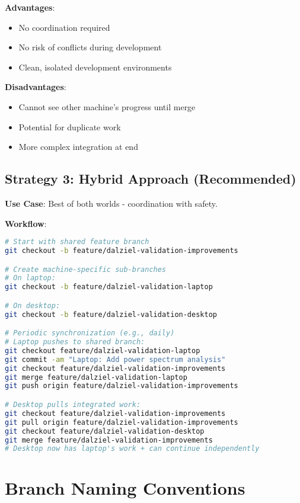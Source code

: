 \documentclass[11pt,letterpaper]{article}
\begin{document}
\textbf{Advantages}:
\begin{itemize}[label=\checkmark]
    \item No coordination required
    \item No risk of conflicts during development
    \item Clean, isolated development environments
\end{itemize}

\textbf{Disadvantages}:
\begin{itemize}[label=\textbullet]
    \item Cannot see other machine's progress until merge
    \item Potential for duplicate work
    \item More complex integration at end
\end{itemize}

\subsection{Strategy 3: Hybrid Approach (Recommended)}

\textbf{Use Case}: Best of both worlds - coordination with safety.

\textbf{Workflow}:
\begin{lstlisting}[language=bash]
# Start with shared feature branch
git checkout -b feature/dalziel-validation-improvements

# Create machine-specific sub-branches
# On laptop:
git checkout -b feature/dalziel-validation-laptop

# On desktop:
git checkout -b feature/dalziel-validation-desktop

# Periodic synchronization (e.g., daily)
# Laptop pushes to shared branch:
git checkout feature/dalziel-validation-laptop
git commit -am "Laptop: Add power spectrum analysis"
git checkout feature/dalziel-validation-improvements
git merge feature/dalziel-validation-laptop
git push origin feature/dalziel-validation-improvements

# Desktop pulls integrated work:
git checkout feature/dalziel-validation-improvements
git pull origin feature/dalziel-validation-improvements
git checkout feature/dalziel-validation-desktop
git merge feature/dalziel-validation-improvements
# Desktop now has laptop's work + can continue independently
\end{lstlisting}

\section{Branch Naming Conventions}
\end{document}
